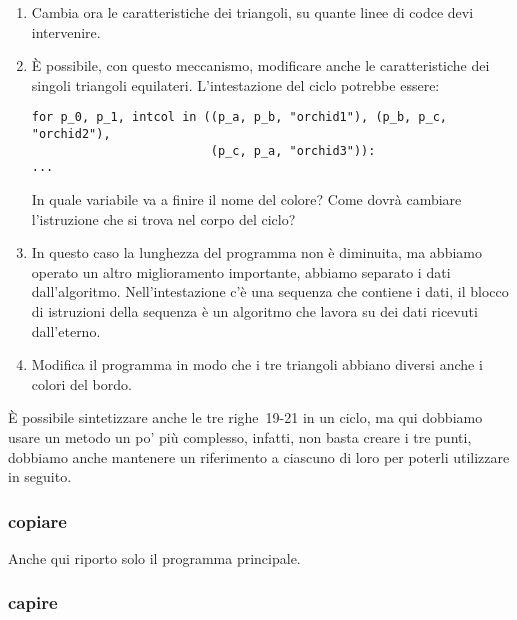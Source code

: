 \begin{enumerate} [noitemsep]
 \item Cambia ora le caratteristiche dei triangoli, su quante linee di codce 
devi intervenire.
 \item È possibile, con questo meccanismo, modificare anche le caratteristiche 
dei singoli triangoli equilateri. L'intestazione del ciclo potrebbe essere:
\begin{lstlisting}[firstnumber=22]
for p_0, p_1, intcol in ((p_a, p_b, "orchid1"), (p_b, p_c, "orchid2"),
                         (p_c, p_a, "orchid3")): 
...
\end{lstlisting}
In quale variabile va a finire il nome del colore? Come dovrà cambiare 
l'istruzione che si trova nel corpo del ciclo?
 \item In questo caso la lunghezza del programma non è diminuita, ma abbiamo 
operato un altro miglioramento importante, abbiamo separato i dati 
dall'algoritmo. Nell'intestazione c'è una sequenza che contiene i dati, il 
blocco di istruzioni della sequenza è un algoritmo che lavora su dei dati 
ricevuti dall'eterno.
 \item Modifica il programma in modo che i tre triangoli abbiano diversi anche 
i colori del bordo.
\end{enumerate}

È possibile sintetizzare anche le tre righe~19-21 in un ciclo, ma qui dobbiamo 
usare un metodo un po' più complesso, infatti, non basta creare i tre punti, 
dobbiamo anche mantenere un riferimento a ciascuno di loro per poterli 
utilizzare in seguito.

\newpage %

\subsubsection{copiare}

Anche qui riporto solo il programma principale.



\subsubsection{capire}


